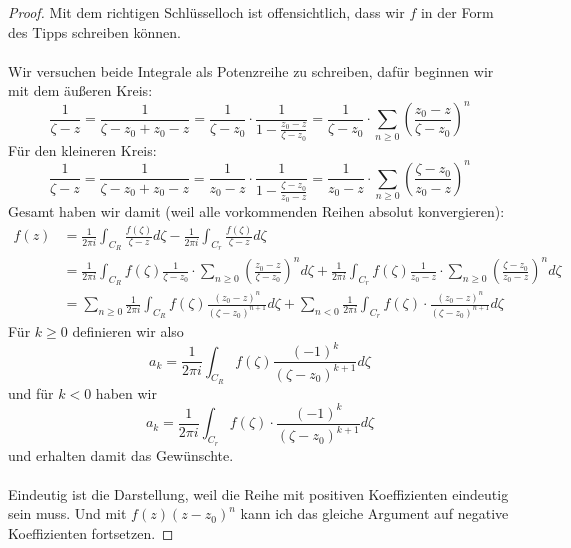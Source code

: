 \documentclass[11pt]{article}
\begin{document}
    \begin{proof}
        Mit dem richtigen Schlüsselloch ist offensichtlich, dass wir $f$ in der Form des Tipps schreiben
        können. \\\\
        Wir versuchen beide Integrale als Potenzreihe zu schreiben, dafür beginnen wir mit dem äußeren Kreis:
        $$\frac{1}{\zeta -z} = \frac{1}{\zeta-z_0+z_0- z} = \frac{1}{\zeta -z_0}\cdot \frac{1}{1-\frac{z_0-z}
        {\zeta -z_0}} = \frac{1}{\zeta -z_0}\cdot\sum_{n\geq 0}\left(\frac{z_0-z}{\zeta -z_0}\right)^n$$
        Für den kleineren Kreis:
        $$\frac{1}{\zeta -z} = \frac{1}{\zeta-z_0+z_0- z} = \frac{1}{z_0 -z}\cdot \frac{1}{1-\frac{\zeta-z_0}
        {z_0-z}} = \frac{1}{z_0 -z}\cdot\sum_{n\geq 0}\left(\frac{\zeta-z_0}{z_0-z}\right)^n$$
        Gesamt haben wir damit (weil alle vorkommenden Reihen absolut konvergieren):
        $$\begin{aligned}
              f(z)&=\frac{1}{2\pi i}\int_{C_R}\frac{f(\zeta)}{\zeta -z}d\zeta-\frac{1}{2\pi i}\int_{C_r}
              \frac{f(\zeta)}{\zeta -z}d\zeta\\
              &= \frac{1}{2\pi i}\int_{C_R}f(\zeta)\frac{1}{\zeta -z_0}\cdot\sum_{n\geq 0}\left(\frac{z_0-z}
              {\zeta -z_0}\right)^nd\zeta + \frac{1}{2\pi i}\int_{C_r}f(\zeta)\frac{1}{z_0 -z}\cdot
              \sum_{n\geq 0}\left(\frac{\zeta-z_0}{z_0-z}\right)^nd\zeta\\
              &=\sum_{n\geq 0}\frac{1}{2\pi i}\int_{C_R}f(\zeta)\frac{(z_0-z)^n}
              {(\zeta -z_0)^{n+1}}d\zeta + \sum_{n< 0}\frac{1}{2\pi i}\int_{C_r}f(\zeta)\cdot
              \frac{(z_0-z)^{n}}{(\zeta-z_0)^{n+1}}d\zeta
        \end{aligned}$$
        Für $k\geq 0$ definieren wir also
        $$a_k = \frac{1}{2\pi i}\int_{C_R}f(\zeta)\frac{(-1)^k}{(\zeta -z_0)^{k+1}}d\zeta$$
        und für $k<0$ haben wir
        $$a_k = \frac{1}{2\pi i}\int_{C_r}f(\zeta)\cdot\frac{(-1)^{k}}{(\zeta-z_0)^{k+1}}d\zeta$$
        und erhalten damit das Gewünschte.\\\\
        Eindeutig ist die Darstellung, weil die Reihe mit positiven Koeffizienten eindeutig
        sein muss. Und mit $f(z)(z-z_0)^n$ kann ich das gleiche Argument auf negative
        Koeffizienten fortsetzen.
    \end{proof}
\end{document}
